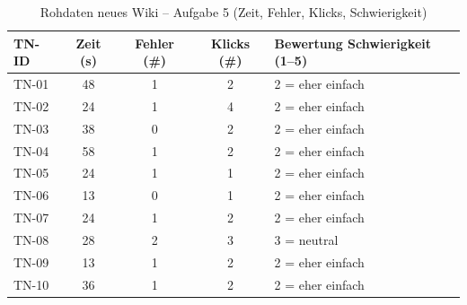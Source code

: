 \begin{table}[H]
\centering
\caption{Rohdaten neues Wiki -- Aufgabe 5 (Zeit, Fehler, Klicks, Schwierigkeit)}
\label{tab:BB-neu-task5}
\begin{tabularx}{\textwidth}{l c c c X}
\toprule
TN-ID & Zeit (s) & Fehler (\#) & Klicks (\#) & Bewertung Schwierigkeit (1--5) \\
\midrule
TN-01 & 48 & 1 & 2 & 2 = eher einfach \\
TN-02 & 24 & 1 & 4 & 2 = eher einfach \\
TN-03 & 38 & 0 & 2 & 2 = eher einfach \\
TN-04 & 58 & 1 & 2 & 2 = eher einfach \\
TN-05 & 24 & 1 & 1 & 2 = eher einfach \\
TN-06 & 13 & 0 & 1 & 2 = eher einfach \\
TN-07 & 24 & 1 & 2 & 2 = eher einfach \\
TN-08 & 28 & 2 & 3 & 3 = neutral \\
TN-09 & 13 & 1 & 2 & 2 = eher einfach \\
TN-10 & 36 & 1 & 2 & 2 = eher einfach \\
\bottomrule
\end{tabularx}
\end{table}

